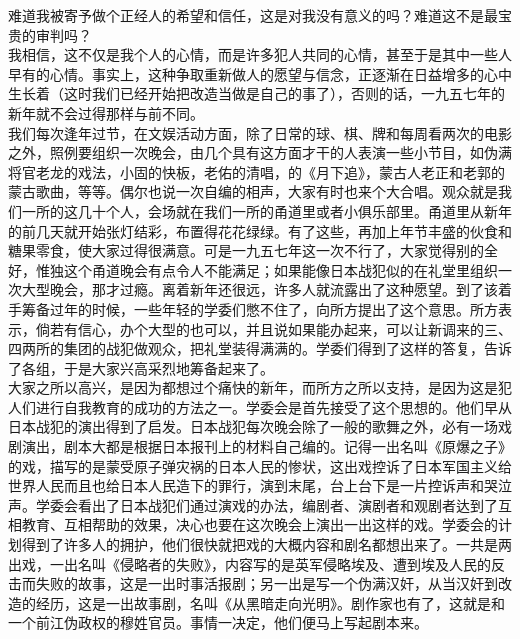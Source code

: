 难道我被寄予做个正经人的希望和信任，这是对我没有意义的吗？难道这不是最宝贵的审判吗？\\

我相信，这不仅是我个人的心情，而是许多犯人共同的心情，甚至于是其中一些人早有的心情。事实上，这种争取重新做人的愿望与信念，正逐渐在日益增多的心中生长着（这时我们已经开始把改造当做是自己的事了），否则的话，一九五七年的新年就不会过得那样与前不同。\\

我们每次逢年过节，在文娱活动方面，除了日常的球、棋、牌和每周看两次的电影之外，照例要组织一次晚会，由几个具有这方面才干的人表演一些小节目，如伪满将官老龙的戏法，小固的快板，老佑的清唱，的《月下追》，蒙古人老正和老郭的蒙古歌曲，等等。偶尔也说一次自编的相声，大家有时也来个大合唱。观众就是我们一所的这几十个人，会场就在我们一所的甬道里或者小俱乐部里。甬道里从新年的前几天就开始张灯结彩，布置得花花绿绿。有了这些，再加上年节丰盛的伙食和糖果零食，使大家过得很满意。可是一九五七年这一次不行了，大家觉得别的全好，惟独这个甬道晚会有点令人不能满足；如果能像日本战犯似的在礼堂里组织一次大型晚会，那才过瘾。离着新年还很远，许多人就流露出了这种愿望。到了该着手筹备过年的时候，一些年轻的学委们憋不住了，向所方提出了这个意思。所方表示，倘若有信心，办个大型的也可以，并且说如果能办起来，可以让新调来的三、四两所的集团的战犯做观众，把礼堂装得满满的。学委们得到了这样的答复，告诉了各组，于是大家兴高采烈地筹备起来了。\\

大家之所以高兴，是因为都想过个痛快的新年，而所方之所以支持，是因为这是犯人们进行自我教育的成功的方法之一。学委会是首先接受了这个思想的。他们早从日本战犯的演出得到了启发。日本战犯每次晚会除了一般的歌舞之外，必有一场戏剧演出，剧本大都是根据日本报刊上的材料自己编的。记得一出名叫《原爆之子》的戏，描写的是蒙受原子弹灾祸的日本人民的惨状，这出戏控诉了日本军国主义给世界人民而且也给日本人民造下的罪行，演到末尾，台上台下是一片控诉声和哭泣声。学委会看出了日本战犯们通过演戏的办法，编剧者、演剧者和观剧者达到了互相教育、互相帮助的效果，决心也要在这次晚会上演出一出这样的戏。学委会的计划得到了许多人的拥护，他们很快就把戏的大概内容和剧名都想出来了。一共是两出戏，一出名叫《侵略者的失败》，内容写的是英军侵略埃及、遭到埃及人民的反击而失败的故事，这是一出时事活报剧；另一出是写一个伪满汉奸，从当汉奸到改造的经历，这是一出故事剧，名叫《从黑暗走向光明》。剧作家也有了，这就是和一个前江伪政权的穆姓官员。事情一决定，他们便马上写起剧本来。\\


